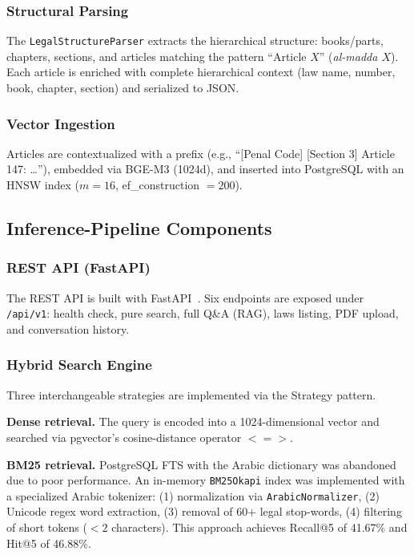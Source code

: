 \subsubsection{Structural Parsing}

The \texttt{LegalStructureParser} extracts the hierarchical structure:
books/parts, chapters, sections, and articles matching the pattern
``Article $X$'' (\emph{al-madda $X$}). Each article is enriched with complete
hierarchical context (law name, number, book, chapter, section) and
serialized to JSON.

\subsubsection{Vector Ingestion}

Articles are contextualized with a prefix (e.g., ``[Penal Code] [Section 3]
Article 147: \ldots''), embedded via BGE-M3 (1024d), and inserted into
PostgreSQL with an HNSW index ($m=16$, ef\_construction $=200$).

\subsection{Inference-Pipeline Components}

\subsubsection{REST API (FastAPI)}

The REST API is built with FastAPI~\cite{fastapi2023}. Six endpoints are
exposed under \texttt{/api/v1}: health check, pure search, full Q\&A (RAG),
laws listing, PDF upload, and conversation history.

\subsubsection{Hybrid Search Engine}

Three interchangeable strategies are implemented via the Strategy pattern.

\textbf{Dense retrieval.} The query is encoded into a 1024-dimensional vector
and searched via pgvector's cosine-distance operator $\mathtt{<=>}$.

\textbf{BM25 retrieval.} PostgreSQL FTS with the Arabic dictionary was
abandoned due to poor performance. An in-memory \texttt{BM25Okapi} index was
implemented with a specialized Arabic tokenizer: (1) normalization via
\texttt{ArabicNormalizer}, (2) Unicode regex word extraction, (3) removal of
60+ legal stop-words, (4) filtering of short tokens ($<2$ characters). This
approach achieves Recall@5 of 41.67\% and Hit@5 of 46.88\%.

